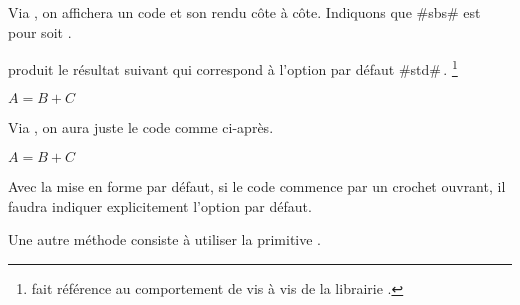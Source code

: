 \documentclass[10pt, a4paper]{../main/main}
\begin{document}
\begin{tdocexa}
    Via , on affichera un code et son rendu côte à côte.
    Indiquons que \tdocinlatex#sbs# est pour  soit .
\end{tdocexa}


\begin{tdocexa}[À la suite]
     produit le résultat suivant qui correspond à l'option par défaut \tdocinlatex#std#\,.
    \footnote{
         fait référence au comportement  de  vis à vis de la librairie .
    }

    \begin{tdoclatex}
        $A = B + C$
    \end{tdoclatex}
\end{tdocexa}


\begin{tdocexa}
    Via , on aura juste le code comme ci-après.

    \begin{tdoclatex}[code]
        $A = B + C$
    \end{tdoclatex}
\end{tdocexa}


\begin{tdocwarn}
    Avec la mise en forme par défaut, si le code commence par un crochet ouvrant, il faudra indiquer explicitement l'option par défaut.

    \smallskip

    Une autre méthode consiste à utiliser la primitive .
\end{tdocwarn}
\end{document}
